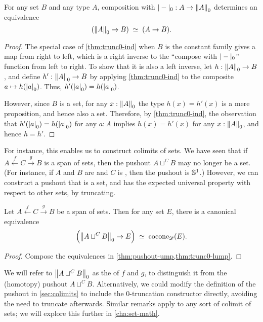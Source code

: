 \begin{lem}\label{thm:trunc0-lump}
  For any set $B$ and any type $A$, composition with $\tprojf0:A\to \trunc0A$ determines an equivalence
  \[ \eqvspaced{(\trunc0A\to B)}{(A\to B)}. \]
\end{lem}
\begin{proof}
  The special case of \autoref{thm:trunc0-ind} when $B$ is the constant family gives a map from right to left, which is a right inverse to the ``compose with $\tprojf0$'' function from left to right.
  To show that it is also a left inverse, let $h:\trunc0A\to B$, and define $h':\trunc0A\to B$ by applying \autoref{thm:trunc0-ind} to the composite $a\mapsto h(\tproj0a)$.
  Thus, $h'(\tproj0a)=h(\tproj0a)$.

  However, since $B$ is a set, for any $x:\trunc0A$ the type $h(x)=h'(x)$ is a mere proposition, and hence also a set.
  Therefore, by \autoref{thm:trunc0-ind}, the observation that $h'(\tproj0a)=h(\tproj0a)$ for any $a:A$ implies $h(x)=h'(x)$ for any $x:\trunc0A$, and hence $h=h'$.
\end{proof}

For instance, this enables us to construct colimits of sets.
We have seen that if $A \xleftarrow{f} C \xrightarrow{g} B$ is a span of sets, then the pushout $A\sqcup^C B$ may no longer be a set.
(For instance, if $A$ and $B$ are \unit and $C$ is \bool, then the pushout is $\Sn^1$.)
However, we can construct a pushout that is a set, and has the expected universal property with respect to other sets, by truncating.

\begin{lem}\label{thm:set-pushout}
  Let $A \xleftarrow{f} C \xrightarrow{g} B$ be a span of sets.
  Then for any set $E$, there is a canonical equivalence
  \[ \Parens{\trunc0{A\sqcup^C B} \to E} \;\simeq\; \cocone{\Ddiag}{E}. \]
\end{lem}
\begin{proof}
  Compose the equivalences in \autoref{thm:pushout-ump,thm:trunc0-lump}.
\end{proof}

We will refer to $\trunc0{A\sqcup^C B}$ as the  of $f$ and $g$, to distinguish it from the (homotopy) pushout $A\sqcup^C B$.
Alternatively, we could modify the definition of the pushout in \autoref{sec:colimits} to include the $0$-truncation constructor directly, avoiding the need to truncate afterwards.
Similar remarks apply to any sort of colimit of sets; we will explore this further in \autoref{cha:set-math}.

